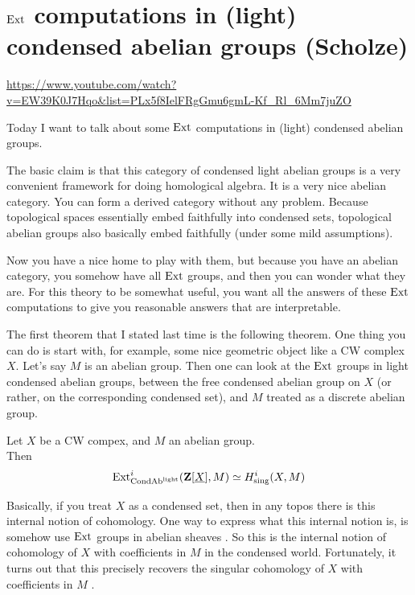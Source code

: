 
\section{\ufs $\operatorname{Ext}$ computations in (light) condensed abelian groups (Scholze)}

\url{https://www.youtube.com/watch?v=EW39K0J7Hqo&list=PLx5f8IelFRgGmu6gmL-Kf_Rl_6Mm7juZO}
\renewcommand{\yt}[2]{\href{https://www.youtube.com/watch?v=EW39K0J7Hqo&list=PLx5f8IelFRgGmu6gmL-Kf_Rl_6Mm7juZO&t=#1}{#2}}
\vspace{1em}


Today I want to talk about some $\operatorname{Ext}$ computations in (light) condensed abelian groups.

The basic claim is that this category of condensed light abelian groups is a very convenient framework for doing homological algebra. It is a very nice abelian category. You can form a derived category without any problem. Because topological spaces essentially embed faithfully into condensed sets, topological abelian groups also basically embed faithfully (under some mild assumptions).

Now you have a nice home to play with them, but because you have an abelian category, you somehow have all $\operatorname{Ext}$ groups, and then you can wonder what they are. For this theory to be somewhat useful, you want all the answers of these $\operatorname{Ext}$ computations to give you reasonable answers that are interpretable.

The first theorem that I stated last time is the following theorem. One thing you can do is start with, for example, some nice geometric object like a CW complex $X$. Let's say $M$ is an abelian group. Then one can look at the $\operatorname{Ext}$ groups in light condensed abelian groups, between the free condensed abelian group on $X$ (or rather, on the corresponding condensed set), and $M$ treated as a discrete abelian group.

\begin{theorem}
Let $X$ be a CW compex, and $M$ an abelian group. \\
Then 
\begin{align*}
\operatorname{Ext}^i_{\mathrm{Cond}\mathrm{Ab}^{\mathrm{light}}} (\mathbf Z [\underline{X}], M) \simeq H^i_{\mathrm{sing}}(X, M)
\end{align*}
\end{theorem}

Basically, if you treat $X$ as a condensed set, then in any topos there is this internal notion of cohomology. One way to express what this internal notion is, is somehow use $\operatorname{Ext}$ groups in abelian sheaves . So this is the internal notion of cohomology of $X$ with coefficients in $M$ in the condensed world. 
Fortunately, it turns out that this precisely recovers the singular cohomology of $X$ with coefficients in $M$ .

